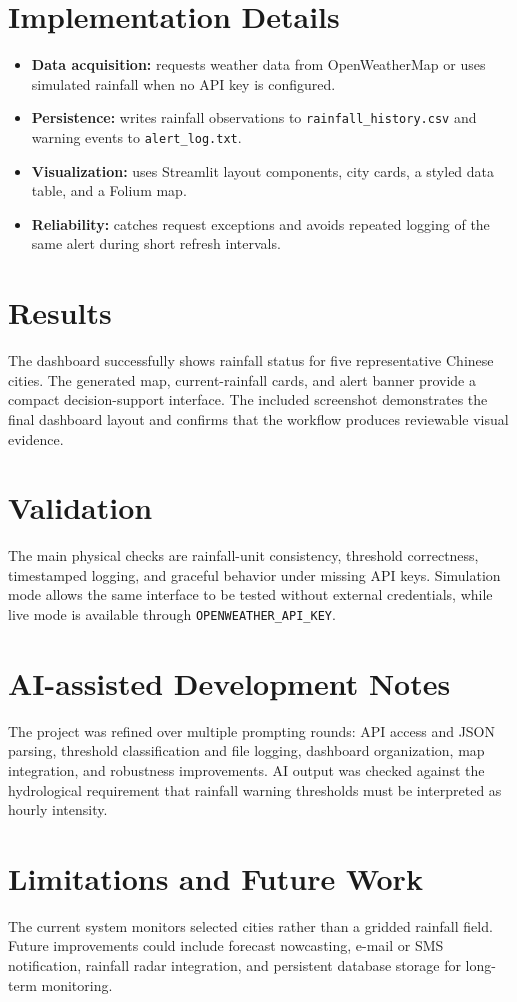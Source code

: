 \documentclass[11pt]{article}
\begin{document}
\section*{Implementation Details}
\begin{itemize}
  \item \textbf{Data acquisition:} requests weather data from OpenWeatherMap or uses simulated rainfall when no API key is configured.
  \item \textbf{Persistence:} writes rainfall observations to \texttt{rainfall\_history.csv} and warning events to \texttt{alert\_log.txt}.
  \item \textbf{Visualization:} uses Streamlit layout components, city cards, a styled data table, and a Folium map.
  \item \textbf{Reliability:} catches request exceptions and avoids repeated logging of the same alert during short refresh intervals.
\end{itemize}

\section*{Results}
The dashboard successfully shows rainfall status for five representative Chinese cities. The generated map, current-rainfall cards, and alert banner provide a compact decision-support interface. The included screenshot demonstrates the final dashboard layout and confirms that the workflow produces reviewable visual evidence.

\section*{Validation}
The main physical checks are rainfall-unit consistency, threshold correctness, timestamped logging, and graceful behavior under missing API keys. Simulation mode allows the same interface to be tested without external credentials, while live mode is available through \texttt{OPENWEATHER\_API\_KEY}.

\section*{AI-assisted Development Notes}
The project was refined over multiple prompting rounds: API access and JSON parsing, threshold classification and file logging, dashboard organization, map integration, and robustness improvements. AI output was checked against the hydrological requirement that rainfall warning thresholds must be interpreted as hourly intensity.

\section*{Limitations and Future Work}
The current system monitors selected cities rather than a gridded rainfall field. Future improvements could include forecast nowcasting, e-mail or SMS notification, rainfall radar integration, and persistent database storage for long-term monitoring.
\end{document}
